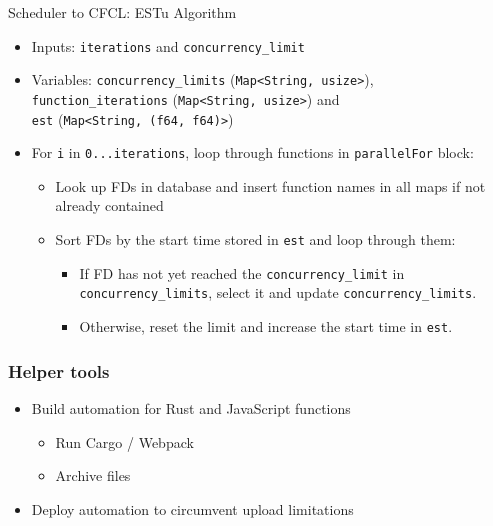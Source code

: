 \documentclass[11pt,t,usepdftitle=false,aspectratio=169]{beamer}
\begin{document}
\begin{frame}{Scheduler to CFCL: ESTu Algorithm}
  \begin{itemize}
    \item Inputs: \texttt{iterations} and \texttt{concurrency\_limit}
    \item Variables: \texttt{concurrency\_limits} (\texttt{Map<String, usize>}), \\ \texttt{function\_iterations} (\texttt{Map<String, usize>}) and \\ \texttt{est} (\texttt{Map<String, (f64, f64)>})
    \item For \texttt{i} in \texttt{0...iterations}, loop through functions in \texttt{parallelFor} block:
      \begin{itemize}
        \item Look up FDs in database and insert function names in all maps if not already contained
        \item Sort FDs by the start time stored in \texttt{est} and loop through them:
          \begin{itemize}
            \item If FD has not yet reached the \texttt{concurrency\_limit} in \texttt{concurrency\_limits}, select it and update \texttt{concurrency\_limits}.
            \item Otherwise, reset the limit and increase the start time in \texttt{est}.
          \end{itemize}
    \end{itemize}
  \end{itemize}
\end{frame}

\begin{frame}
\frametitle{Helper tools}
    \begin{itemize}
        \item Build automation for Rust and JavaScript functions
          \begin{itemize}
            \item Run Cargo / Webpack
            \item Archive files
          \end{itemize}
        \item Deploy automation to circumvent upload limitations
    \end{itemize}
    \vspace{1cm}
\end{frame}
\end{document}
